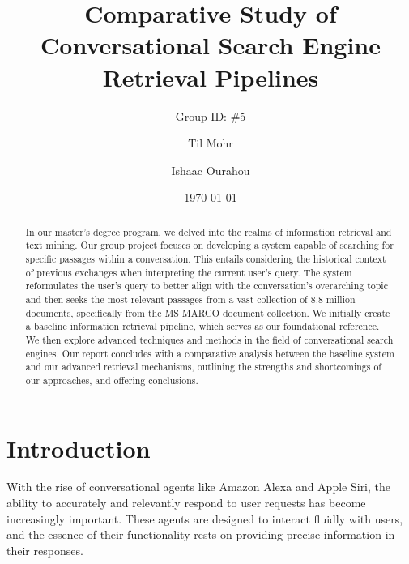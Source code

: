 \documentclass[sigconf]{acmart}
\begin{document}
\title{Comparative Study of Conversational Search Engine Retrieval Pipelines}
\subtitle{Group ID: \#5}

\author{Til Mohr}
\affiliation{}

\author{Ishaac Ourahou}
\affiliation{}

\date{\today}



\begin{abstract}
In our master's degree program, we delved into the realms of information retrieval and text mining. Our group project focuses on developing a system capable of searching for specific passages within a conversation. This entails considering the historical context of previous exchanges when interpreting the current user's query. The system reformulates the user's query to better align with the conversation's overarching topic and then seeks the most relevant passages from a vast collection of 8.8 million documents, specifically from the MS MARCO document collection. We initially create a baseline information retrieval pipeline, which serves as our foundational reference. We then explore advanced techniques and methods in the field of conversational search engines. Our report concludes with a comparative analysis between the baseline system and our advanced retrieval mechanisms, outlining the strengths and shortcomings of our approaches, and offering conclusions.
\end{abstract}


\renewcommand\footnotetextcopyrightpermission[1]{}
\pagestyle{plain}

\maketitle


\section{Introduction}\label{sec:intro}
With the rise of conversational agents like Amazon Alexa and Apple Siri, the ability to accurately and relevantly respond to user requests has become increasingly important. These agents are designed to interact fluidly with users, and the essence of their functionality rests on providing precise information in their responses.
\end{document}
